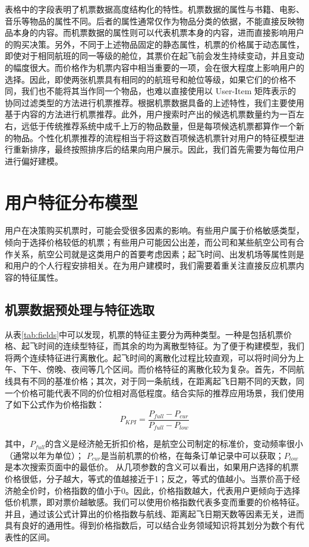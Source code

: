 表格中的字段表明了机票数据高度结构化的特性。机票数据的属性与书籍、电影、音乐等物品的属性不同。后者的属性通常仅作为物品分类的依据，不能直接反映物品本身的内容。而机票数据的属性则可以代表机票本身的内容，进而直接影响用户的购买决策。另外，不同于上述物品固定的静态属性，机票的价格属于动态属性，即使对于相同航班的同一等级的舱位，其票价在起飞前会发生持续变动，并且变动的幅度很大。而价格作为机票内容中相当重要的一项，会在很大程度上影响用户的选择。因此，即使两张机票具有相同的的航班号和舱位等级，如果它们的价格不同，我们也不能将其当作同一个物品，也难以直接使用以 User-Item 矩阵表示的协同过滤类型的方法进行机票推荐。根据机票数据具备的上述特性，我们主要使用基于内容的方法进行机票推荐。此外，用户搜索时产出的候选机票数量约为一百左右，远低于传统推荐系统中成千上万的物品数量，但是每项候选机票都算作一个新的物品。个性化机票推荐的流程相当于将这数百项候选机票针对用户的特征模型进行重新排序，最终按照排序后的结果向用户展示。因此，我们首先需要为每位用户进行偏好建模。

\section{用户特征分布模型}

用户在决策购买机票时，可能会受很多因素的影响。有些用户属于价格敏感类型，倾向于选择价格较低的机票；有些用户可能因公出差，而公司和某些航空公司有合作关系，航空公司就是这类用户的首要考虑因素；起飞时间、出发机场等属性则是和用户的个人行程安排相关。在为用户建模时，我们需要着重关注直接反应机票内容的特征属性。

\subsection{机票数据预处理与特征选取}

从表\ref{tab:fields}中可以发现，机票的特征主要分为两种类型。一种是包括机票价格、起飞时间的连续型特征，而其余的均为离散型特征。为了便于构建模型，我们将两个连续特征进行离散化。起飞时间的离散化过程比较直观，可以将时间分为上午、下午、傍晚、夜间等几个区间。而价格特征的离散化较为复杂。首先，不同航线具有不同的基准价格；其次，对于同一条航线，在距离起飞日期不同的天数，同一个价格可能代表不同的价位相对高低程度。结合实际的推荐应用场景，我们使用了如下公式作为价格指数：
\begin{equation}
	P_{KPI} = \frac{P_{full} - P_{cur}}{P_{full} - P_{low}}
\end{equation}

其中，$P_{full}$的含义是经济舱无折扣价格，是航空公司制定的标准价，变动频率很小（通常以年为单位）；
$P_{cur}$是当前机票的价格，在每条订单记录中可以获取；$P_{low}$是本次搜索页面中的最低价。
从几项参数的含义可以看出，如果用户选择的机票价格很低，分子越大，等式的值越接近于1；反之，等式的值越小。当票价高于经济舱全价时，价格指数的值小于0。因此，价格指数越大，代表用户更倾向于选择低价机票，即对票价越敏感。我们可以使用价格指数代表多变而重要的价格特征。并且，通过该公式计算出的价格指数与航线、距离起飞日期天数等因素无关，进而具有良好的通用性。得到价格指数后，可以结合业务领域知识将其划分为数个有代表性的区间。

